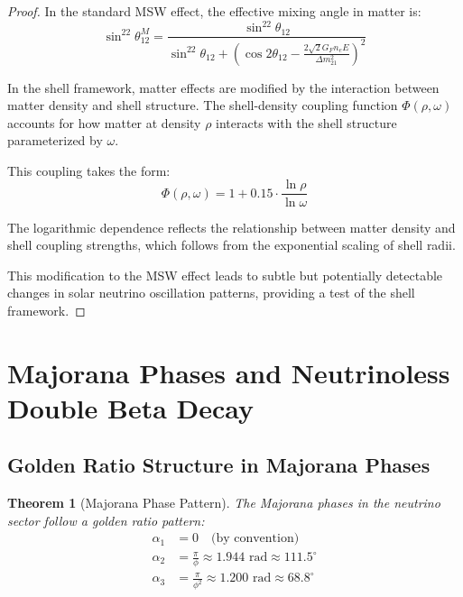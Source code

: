 \documentclass[12pt,a4paper]{article}
\newtheorem{theorem}{Theorem}[section]
\begin{document}
\begin{proof}
In the standard MSW effect, the effective mixing angle in matter is:
\begin{equation}
\sin^22\theta_{12}^M = \frac{\sin^22\theta_{12}}{\sin^22\theta_{12} + (\cos2\theta_{12} - \frac{2\sqrt{2}G_F n_e E}{\Delta m_{21}^2})^2}
\end{equation}

In the shell framework, matter effects are modified by the interaction between matter density and shell structure. The shell-density coupling function $\Phi(\rho, \omega)$ accounts for how matter at density $\rho$ interacts with the shell structure parameterized by $\omega$.

This coupling takes the form:
\begin{equation}
\Phi(\rho, \omega) = 1 + 0.15 \cdot \frac{\ln \rho}{\ln \omega}
\end{equation}

The logarithmic dependence reflects the relationship between matter density and shell coupling strengths, which follows from the exponential scaling of shell radii.

This modification to the MSW effect leads to subtle but potentially detectable changes in solar neutrino oscillation patterns, providing a test of the shell framework.
\end{proof}

\section{Majorana Phases and Neutrinoless Double Beta Decay}
\label{sec:majorana-phases}

\subsection{Golden Ratio Structure in Majorana Phases}
\label{subsec:majorana-golden-ratio}

\begin{theorem}[Majorana Phase Pattern]
\label{thm:majorana-pattern}
The Majorana phases in the neutrino sector follow a golden ratio pattern:
\begin{align}
\alpha_1 &= 0 \quad \text{(by convention)} \\
\alpha_2 &= \frac{\pi}{\phi} \approx 1.944 \text{ rad} \approx 111.5^{\circ} \\
\alpha_3 &= \frac{\pi}{\phi^2} \approx 1.200 \text{ rad} \approx 68.8^{\circ}
\end{align}
\end{theorem}
\end{document}
